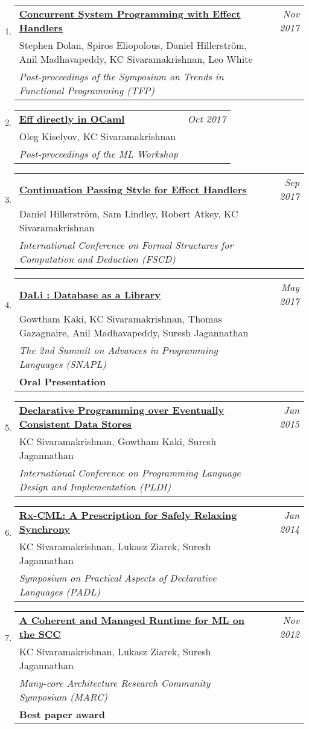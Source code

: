 \documentclass[10pt]{article}
\makeatletter
\newcommand{\lbar}[1]{{\color{#1}\ding{118}}\hspace*{2pt}}
\newenvironment{benumerate}[2]{
    \let\oldItem\item
    \def\item{\addtocounter{enumi}{-2}\oldItem}
    \begin{enumerate}[#2] \itemsep3pt
    \setcounter{enumi}{#1}
    \addtocounter{enumi}{1}}
  {\end{enumerate}}
\newenvironment{publication}[5]
{ \item
  \begin{tabular*}{7.5in}{p{6.3in}@{\extracolsep{\fill}}r}
    \href{#1}{\textbf{#2}} & \textit{#3}\\ #4 &\\ \textit{#5}&\\
  \end{tabular*}
} {}
\newenvironment{publicationNote}[6]
{ \item
  \begin{tabular*}{7.5in}{p{6.3in}@{\extracolsep{\fill}}r}
    \href{#1}{\textbf{#2}} & \textit{#3}\\ #4 &\\ \textit{#5}\\ \textbf{#6} \\
  \end{tabular*}
} {}
\newenvironment{region}[3]{%
  \vspace*{0.5ex}
  {\scalebox{1.4}{\textbf{#1}}}
  \begin{benumerate}{#3}{\color{RoyalBlue}#2}}
  {\end{benumerate}\vspace{0.8ex}}
\makeatother
\begin{document}
\begin{region} {\lbar{purple}Conference Publications}{{C}1}{17}
  \begin{publication}{http://kcsrk.info/papers/system_effects_feb_18.pdf}
    {Concurrent System Programming with Effect Handlers}
    {Nov 2017}{Stephen Dolan, Spiros Eliopolous, Daniel Hillerström, Anil Madhavapeddy, KC Sivaramakrishnan, Leo White}
    {Post-proceedings of the Symposium on Trends in Functional Programming (TFP)}
  \end{publication}

  \begin{publication}{http://kcsrk.info/papers/caml-eff17.pdf}
    {Eff directly in OCaml}
    {Oct 2017}{Oleg Kiselyov, KC Sivaramakrishnan}
    {Post-proceedings of the ML Workshop}
  \end{publication}

  \begin{publication} {http://kcsrk.info/papers/cps-handler-fscd17.pdf}
    {Continuation Passing Style for Effect Handlers}
    {Sep 2017} {Daniel Hillerström, Sam Lindley, Robert Atkey, KC Sivaramakrishnan}
    {International Conference on Formal Structures for Computation and Deduction (FSCD)}
  \end{publication}

  \begin{publicationNote} {http://kcsrk.info/papers/dali_snapl17.pdf}
    {DaLi : Database as a Library}
    {May 2017} {Gowtham Kaki, KC Sivaramakrishnan, Thomas Gazagnaire, Anil Madhavapeddy, Suresh Jagannathan}
    {The 2nd Summit on Advances in Programming Languages (SNAPL)}
    {Oral Presentation}
  \end{publicationNote}

  \begin{publication} {http://kcsrk.info/papers/quelea_pldi15.pdf}
    {Declarative Programming over Eventually Consistent Data Stores}
    {Jun 2015} {KC Sivaramakrishnan, Gowtham Kaki, Suresh Jagannathan}
    {International Conference on Programming Language Design and Implementation (PLDI)}
  \end{publication}

  \begin{publication}{http://kcsrk.info/papers/rxcml_padl14.pdf}
    {Rx-CML: A Prescription for Safely Relaxing Synchrony}
    {Jan 2014}{KC Sivaramakrishnan, Lukasz Ziarek, Suresh Jagannathan}
    {Symposium on Practical Aspects of Declarative Languages (PADL)}
  \end{publication}

  \begin{publicationNote}{http://kcsrk.info/papers/mmscc_marc12.pdf}
    {A Coherent and Managed Runtime for ML on the SCC}
    {Nov 2012}{KC Sivaramakrishnan, Lukasz Ziarek, Suresh Jagannathan}
    {Many-core Architecture Research Community Symposium (MARC)}
    {Best paper award}
  \end{publicationNote}


\end{region}
\end{document}
